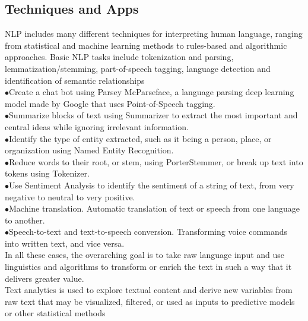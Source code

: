 \subsection{Techniques and Apps}
NLP includes many different techniques for interpreting human language, ranging from statistical and machine learning methods to rules-based and algorithmic approaches.
Basic NLP tasks include tokenization and parsing, lemmatization/stemming, part-of-speech tagging, language detection and identification of semantic relationships\\
\indent$\bullet$\hspace{5pt}Create a chat bot using Parsey McParseface, a language parsing deep learning model made by Google that uses Point-of-Speech tagging.\\
\indent$\bullet$\hspace{5pt}Summarize blocks of text using Summarizer to extract the most important and central ideas while ignoring irrelevant information.\\
\indent$\bullet$\hspace{5pt}Identify the type of entity extracted, such as it being a person, place, or organization using Named Entity Recognition.\\
\indent$\bullet$\hspace{5pt}Reduce words to their root, or stem, using PorterStemmer, or break up text into tokens using Tokenizer.\\
\indent$\bullet$\hspace{5pt}Use Sentiment Analysis to identify the sentiment of a string of text, from very negative to neutral to very positive.\\
\indent$\bullet$\hspace{5pt}Machine translation. Automatic translation of text or speech from one language to another.\\
\indent$\bullet$\hspace{5pt}Speech-to-text and text-to-speech conversion. Transforming voice commands into written text, and vice versa.\\
In all these cases, the overarching goal is to take raw language input and use linguistics and algorithms to transform or enrich the text in such a way that it delivers greater value.\\
Text analytics is used to explore textual content and derive new variables from raw text that may be visualized, filtered, or used as inputs to predictive models or other statistical methods\\
